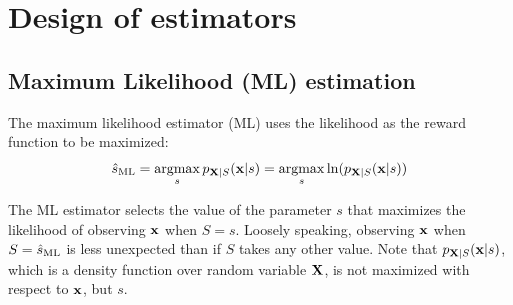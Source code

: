 \section{Design of estimators}

\subsection{Maximum Likelihood (ML) estimation}

The maximum likelihood estimator (ML) uses the likelihood as the reward function to be maximized:
\begin{equation}
\hat{s}_\text{ML} = \operatorname*{argmax}_s p_{{\bf X}|S}({\bf x}|s)
     = \operatorname*{argmax}_s \ln(p_{{\bf X}|S}({\bf x}|s))
\label{ec:est_ML}
\end{equation}

The ML estimator selects the value of the parameter $s$ that maximizes the likelihood of observing ${\bf x}$ when $S=s$. Loosely speaking, observing ${\bf x}$ when $S=\hat{s}_\text{ML}$ is less unexpected than if $S$ takes any other value. Note that $p_{{\bf X}|S}({\bf x}|s)$, which is a density function over random variable ${\bf X}$, is not maximized with respect to ${\bf x}$, but $s$. 

